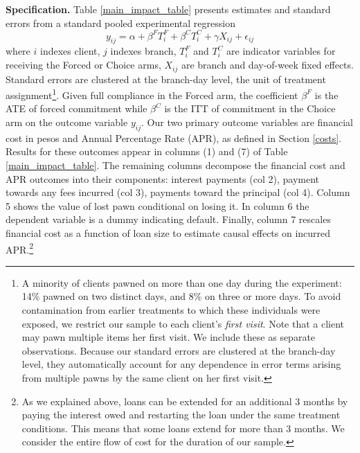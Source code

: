 \documentclass[ecta,nameyear,final]{econsocart}
\begin{document}

\noindent \textbf{Specification.} Table \ref{main_impact_table} presents estimates and standard errors from a standard pooled experimental regression 
\begin{equation} \label{basic_reg}
    y_{ij} = \alpha + \beta^F T_{i}^F + \beta^C T_{i}^C + \gamma X_{ij} + \epsilon_{ij}
\end{equation}
where $i$ indexes client, $j$ indexes branch, $T_{i}^F$ and $T_{i}^C$ are indicator variables for receiving the Forced or Choice arms, $X_{ij}$ are branch and day-of-week fixed effects. Standard errors are clustered at the branch-day level, the unit of treatment assignment\footnote{A minority of clients pawned on more than one day during the experiment: 14\% pawned on two distinct days, and 8\% on three or more days. To avoid contamination from earlier treatments to which these individuals were exposed, we restrict our sample to each client's \emph{first visit}. Note that a client may pawn multiple items her first visit. We include these as separate observations. Because our standard errors are clustered at the branch-day level, they automatically account for any dependence in error terms arising from multiple pawns by the same client on her first visit.}.
Given full compliance in the Forced arm, the coefficient $\beta^F$ is the ATE of forced commitment while $\beta^C$ is the ITT of commitment in the Choice arm on the outcome variable $y_{ij}$.
Our two primary outcome variables are financial cost in pesos and Annual Percentage Rate (APR), as defined in Section \ref{costs}. 
Results for these outcomes appear in columns (1) and (7) of Table \ref{main_impact_table}.
The remaining columns decompose the financial cost and APR outcomes into their components: interest payments (col 2), payment towards any fees incurred (col 3), payments toward the principal (col 4). Column 5 shows the value of lost pawn conditional on losing it.  In column 6 the dependent variable is a dummy indicating default.  Finally, column 7 rescales financial cost as a function of loan size to estimate causal effects on incurred APR.\footnote{As we explained above, loans can be extended for an additional 3 months by paying the interest owed and restarting the loan under the same treatment conditions. This means that some loans extend for more than 3 months. We consider the entire flow of cost for the duration of our sample.}  
\end{document}
